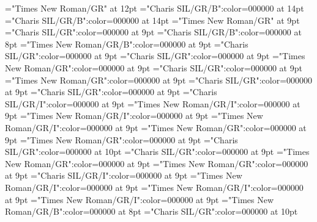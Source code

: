 \documentclass[gps1,twoside]{article}
\begin{document}
\font\xitemtpi="Times New Roman/GR" at 12pt
\font{}="Charis SIL/GR/B":color=000000 at 14pt
\font{}="Charis SIL/GR/B":color=000000 at 14pt
\font{}="Times New Roman/GR" at 9pt
\font\entryletDatadicBody="Charis SIL/GR":color=000000 at 9pt
\font\headwordggoTeluINentryletDatadicBody="Charis SIL/GR/B":color=000000 at 8pt
\font\spanenheadwordggoTeluINentryletDatadicBody="Times New Roman/GR/B":color=000000 at 9pt
\font\pronunciationsentryletDatadicBody="Charis SIL/GR":color=000000 at 9pt
\font\pronunciationggofonipaxemicpronunciationsentryletDatadicBody="Charis SIL/GR":color=000000 at 9pt
\font\spanenpronunciationggofonipaxemicpronunciationsentryletDatadicBody="Times New Roman/GR":color=000000 at 9pt
\font\spanggofonipaxemicpronunciationggofonipaxemicpronunciationsentryletDatadicBody="Charis SIL/GR":color=000000 at 9pt
\font\spanenpronunciationsentryletDatadicBody="Times New Roman/GR":color=000000 at 9pt
\font\sensesentryletDatadicBody="Charis SIL/GR":color=000000 at 9pt
\font\sensesensesentryletDatadicBody="Charis SIL/GR":color=000000 at 9pt
\font\grammaticalinfosensesensesentryletDatadicBody="Charis SIL/GR/I":color=000000 at 9pt
\font\partofspeechengrammaticalinfosensesensesentryletDatadicBody="Times New Roman/GR/I":color=000000 at 9pt
\font\spanenpartofspeechengrammaticalinfosensesensesentryletDatadicBody="Times New Roman/GR/I":color=000000 at 9pt
\font\spanengrammaticalinfosensesensesentryletDatadicBody="Times New Roman/GR/I":color=000000 at 9pt
\font{}="Times New Roman/GR":color=000000 at 9pt
\font\spanendefinitionensensesensesentryletDatadicBody="Times New Roman/GR":color=000000 at 9pt
\font\LexSensepublishStemGlossPubLdtesensesensesentryletDatadicBody="Charis SIL/GR":color=000000 at 10pt
\font\spanteLexSensepublishStemGlossPubLdtesensesensesentryletDatadicBody="Charis SIL/GR":color=000000 at 9pt
\font\spanenLexSensepublishStemGlossPubLdtesensesensesentryletDatadicBody="Times New Roman/GR":color=000000 at 9pt
\font\spanensensesentryletDatadicBody="Times New Roman/GR":color=000000 at 9pt
\font\grammaticalinfosensesentryletDatadicBody="Charis SIL/GR/I":color=000000 at 9pt
\font\partofspeechengrammaticalinfosensesentryletDatadicBody="Times New Roman/GR/I":color=000000 at 9pt
\font\spanenpartofspeechengrammaticalinfosensesentryletDatadicBody="Times New Roman/GR/I":color=000000 at 9pt
\font\spanengrammaticalinfosensesentryletDatadicBody="Times New Roman/GR/I":color=000000 at 9pt
\font\xsensenumbersensesensesentryletDatadicBody="Times New Roman/GR/B":color=000000 at 8pt
\font\xitemteLexSensepublishStemGlossPubLdtesensesensesentryletDatadicBody="Charis SIL/GR":color=000000 at 10pt
\end{document}
